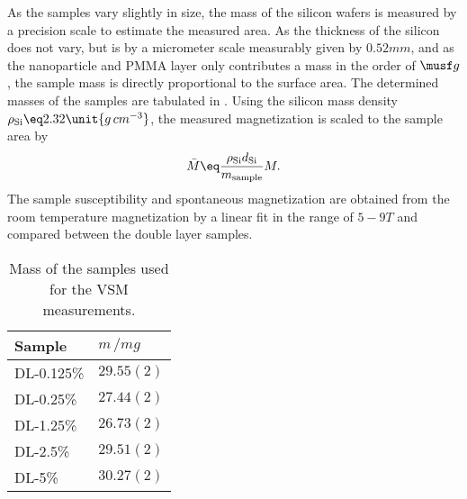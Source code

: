 \documentclass[\main/dresen_thesis.tex]{subfiles}
\begin{document}
    As the samples vary slightly in size, the mass of the silicon wafers is measured by a precision scale to estimate the measured area. As the thickness of the silicon does not vary, but is by a micrometer scale measurably given by $0.52 \unit{mm}$, and as the nanoparticle and PMMA layer only contributes a mass in the order of $\musf g$, the sample mass is directly proportional to the surface area.
    The determined masses of the samples are tabulated in .
    Using the silicon mass density $\rho_\mathrm{Si} \eq 2.32 \unit{g \, cm^{-3}}$, the measured magnetization is scaled to the sample area by
    \begin{align}
      \bar{M} \eq \frac{\rho_\mathrm{Si} d_\mathrm{Si}}{m_\mathrm{sample}} M.
    \end{align}
    The sample susceptibility and spontaneous magnetization are obtained from the room temperature magnetization by a linear fit in the range of $5 - 9 \unit{T}$ and compared between the double layer samples.

    \begin{table}[!htbp]
      \centering
      \caption{\label{tab:doubleLayers:layerCharacterization:ppmsMasses}Mass of the samples used for the VSM measurements.}
      \begin{tabular}{ l | l}
        \rule{0pt}{2ex} \textbf{Sample}  & $m \, / \unit{mg}$ \\
        \hline
        \rule{0pt}{2ex} DL-0.125\%   & $29.55(2)$ \\
        \rule{0pt}{2ex} DL-0.25\%    & $27.44(2)$ \\
        \rule{0pt}{2ex} DL-1.25\%    & $26.73(2)$ \\
        \rule{0pt}{2ex} DL-2.5\%     & $29.51(2)$ \\
        \rule{0pt}{2ex} DL-5\%       & $30.27(2)$ \\
        \hline
      \end{tabular}
    \end{table}
\end{document}
